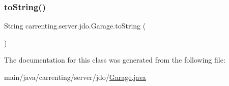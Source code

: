 \subsubsection{\texorpdfstring{toString()}{toString()}}
{\footnotesize\ttfamily String carrenting.\+server.\+jdo.\+Garage.\+to\+String (\begin{DoxyParamCaption}{ }\end{DoxyParamCaption})}



The documentation for this class was generated from the following file\+:\begin{DoxyCompactItemize}
\item 
main/java/carrenting/server/jdo/\mbox{\hyperlink{_garage_8java}{Garage.\+java}}\end{DoxyCompactItemize}
